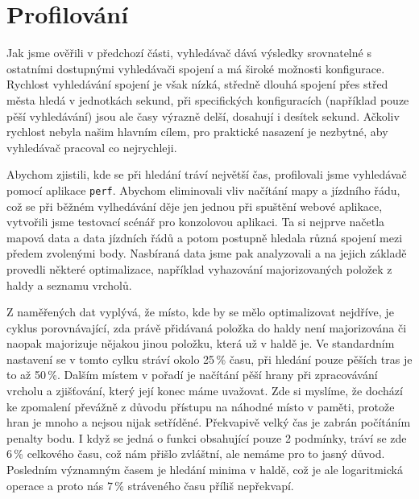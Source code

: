 \section{Profilování}
Jak jsme ověřili v předchozí části, vyhledávač dává výsledky srovnatelné s
ostatními dostupnými vyhledávači spojení a má široké možnosti konfigurace.
Rychlost vyhledávání spojení je však nízká, středně dlouhá spojení přes střed
města hledá v jednotkách sekund, při specifických konfiguracích (například pouze
pěší vyhledávání) jsou ale časy výrazně delší, dosahují i desítek sekund.
Ačkoliv rychlost nebyla našim hlavním cílem, pro praktické nasazení je nezbytné,
aby vyhledávač pracoval co nejrychleji. 

Abychom zjistili, kde se při hledání tráví největší čas, profilovali jsme
vyhledávač pomocí aplikace {\tt perf}. Abychom eliminovali vliv načítání mapy a
jízdního řádu, což se při běžném vylhedávání děje jen jednou při spuštění webové
aplikace, vytvořili jsme testovací scénář pro konzolovou aplikaci. Ta si nejprve
načetla mapová data a data jízdních řádů a potom postupně hledala různá spojení
mezi předem zvolenými body. Nasbíraná data jsme pak analyzovali a na jejich
základě provedli některé optimalizace, například vyhazování majorizovaných
položek z haldy a seznamu vrcholů.

Z naměřených dat vyplývá, že místo, kde by se mělo optimalizovat nejdříve, je
cyklus porovnávající, zda právě přidávaná položka do haldy není majorizována či
naopak majorizuje nějakou jinou položku, která už v haldě je. Ve standardním
nastavení se v tomto cylku stráví okolo 25\,\% času, při hledání pouze pěších
tras je to až 50\,\%. Dalším místem v pořadí je načítání pěší hrany při
zpracovávání vrcholu a zjišťování, který její konec máme uvažovat. Zde si
myslíme, že dochází ke zpomalení převážně z důvodu přístupu na náhodné místo v
paměti, protože hran je mnoho a nejsou nijak setříděné. Překvapivě velký čas je
zabrán počítáním penalty bodu. I když se jedná o funkci obsahující pouze 2
podmínky, tráví se zde 6\,\% celkového času, což nám přišlo zvláštní, ale nemáme
pro to jasný důvod. Posledním významným časem je hledání minima v haldě, což je
ale logaritmická operace a proto nás 7\,\% stráveného času příliš nepřekvapí.


